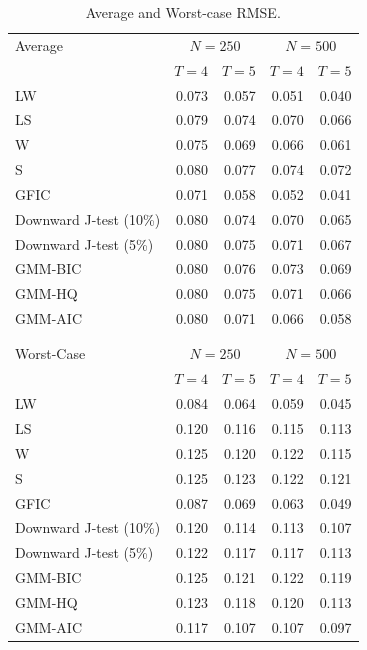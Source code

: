 \begin{table}[!tbp]
\begin{center}
\begin{tabular}{lrrrr}
\hline\hline
\multicolumn{1}{l}{Average}&\multicolumn{2}{c}{$N = 250$}&\multicolumn{2}{c}{$N = 500$}\\
&\multicolumn{1}{c}{$T=4$}&\multicolumn{1}{c}{$T=5$}&\multicolumn{1}{c}{$T=4$}&\multicolumn{1}{c}{$T=5$}\tabularnewline
\hline
LW&0.073&0.057&0.051&0.040\tabularnewline
LS&0.079&0.074&0.070&0.066\tabularnewline
W&0.075&0.069&0.066&0.061\tabularnewline
S&0.080&0.077&0.074&0.072\tabularnewline
\hline
GFIC&0.071&0.058&0.052&0.041\tabularnewline
Downward J-test (10\%)&0.080&0.074&0.070&0.065\tabularnewline
Downward J-test (5\%)&0.080&0.075&0.071&0.067\tabularnewline
GMM-BIC&0.080&0.076&0.073&0.069\tabularnewline
GMM-HQ&0.080&0.075&0.071&0.066\tabularnewline
GMM-AIC&0.080&0.071&0.066&0.058\tabularnewline
\hline\\ \\

\hline\hline
\multicolumn{1}{l}{Worst-Case}&\multicolumn{2}{c}{$N = 250$}&\multicolumn{2}{c}{$N = 500$}\\
&\multicolumn{1}{c}{$T=4$}&\multicolumn{1}{c}{$T=5$}&\multicolumn{1}{c}{$T=4$}&\multicolumn{1}{c}{$T=5$}\tabularnewline
\hline
LW&0.084&0.064&0.059&0.045\tabularnewline
LS&0.120&0.116&0.115&0.113\tabularnewline
W&0.125&0.120&0.122&0.115\tabularnewline
S&0.125&0.123&0.122&0.121\tabularnewline
\hline
GFIC&0.087&0.069&0.063&0.049\tabularnewline
Downward J-test (10\%)&0.120&0.114&0.113&0.107\tabularnewline
Downward J-test (5\%)&0.122&0.117&0.117&0.113\tabularnewline
GMM-BIC&0.125&0.121&0.122&0.119\tabularnewline
GMM-HQ&0.123&0.118&0.120&0.113\tabularnewline
GMM-AIC&0.117&0.107&0.107&0.097\tabularnewline
\hline
\end{tabular}
\end{center}
\caption{Average and Worst-case RMSE.}
\label{tab:rmse}
\end{table}


